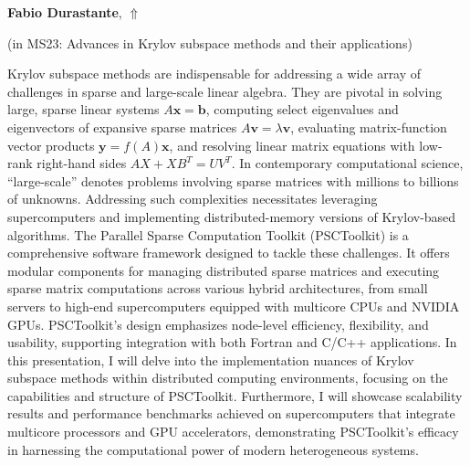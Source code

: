 \documentclass[ILAS2025-program.tex]{subfiles}
\begin{document}
     \hypertarget{down0238}{}\begin{ilasabstract}
    
    \textbf{Fabio Durastante},  \hfill \hyperlink{up0238}{$\Uparrow$}
    
    (in {\color{mstitle}MS23: Advances in Krylov subspace methods and their applications})
        
        \mtskip
    Krylov subspace methods are indispensable for addressing a wide array of challenges in sparse and large-scale linear algebra. They are pivotal in solving large, sparse linear systems \( A \mathbf{x} = \mathbf{b} \), computing select eigenvalues and eigenvectors of expansive sparse matrices \( A \mathbf{v} = \lambda \mathbf{v} \), evaluating matrix-function vector products \( \mathbf{y} = f(A) \mathbf{x} \), and resolving linear matrix equations with low-rank right-hand sides \( A X + X B^T = UV^T \).
In contemporary computational science, ``large-scale'' denotes problems involving sparse matrices with millions to billions of unknowns. Addressing such complexities necessitates leveraging supercomputers and implementing distributed-memory versions of Krylov-based algorithms. The Parallel Sparse Computation Toolkit (PSCToolkit) is a comprehensive software framework designed to tackle these challenges. It offers modular components for managing distributed sparse matrices and executing sparse matrix computations across various hybrid architectures, from small servers to high-end supercomputers equipped with multicore CPUs and NVIDIA GPUs. PSCToolkit's design emphasizes node-level efficiency, flexibility, and usability, supporting integration with both Fortran and C/C++ applications. In this presentation, I will delve into the implementation nuances of Krylov subspace methods within distributed computing environments, focusing on the capabilities and structure of PSCToolkit. Furthermore, I will showcase scalability results and performance benchmarks achieved on supercomputers that integrate multicore processors and GPU accelerators, demonstrating PSCToolkit's efficacy in harnessing the computational power of modern heterogeneous systems.
\end{ilasabstract}
\end{document}
